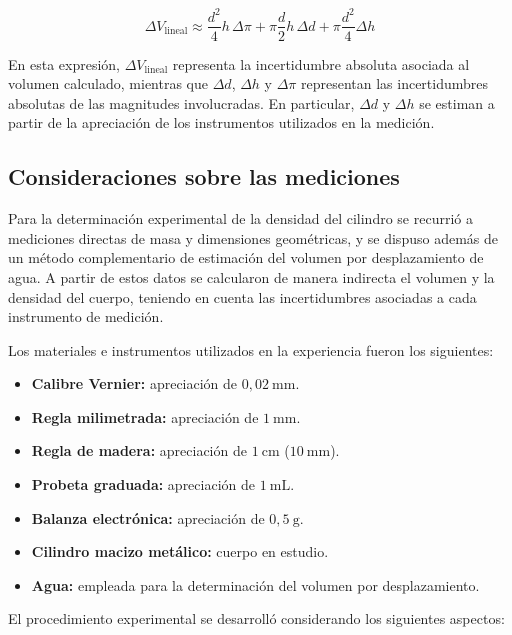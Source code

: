 \begin{equation}
\Delta V_{\text{lineal}} \approx
\frac{d^2}{4} h\, \Delta \pi
+
\pi \frac{d}{2} h\, \Delta d
+
\pi \frac{d^2}{4} \Delta h
\end{equation}

En esta expresión, $\Delta V_{\text{lineal}}$ representa la incertidumbre absoluta asociada al volumen calculado, mientras que $\Delta d$, $\Delta h$ y $\Delta \pi$ representan las incertidumbres absolutas de las magnitudes involucradas. En particular, $\Delta d$ y $\Delta h$ se estiman a partir de la apreciación de los instrumentos utilizados en la medición.


\subsection{Consideraciones sobre las mediciones}

Para la determinación experimental de la densidad del cilindro se recurrió a mediciones directas de masa y dimensiones geométricas, y se dispuso además de un método complementario de estimación del volumen por desplazamiento de agua. A partir de estos datos se calcularon de manera indirecta el volumen y la densidad del cuerpo, teniendo en cuenta las incertidumbres asociadas a cada instrumento de medición.

Los materiales e instrumentos utilizados en la experiencia fueron los siguientes:

\begin{itemize}
    \item \textbf{Calibre Vernier:} apreciación de $0{,}02\ \mathrm{mm}$.
    \item \textbf{Regla milimetrada:} apreciación de $1\ \mathrm{mm}$.
    \item \textbf{Regla de madera:} apreciación de $1\ \mathrm{cm}$ ($10\ \mathrm{mm}$).
    \item \textbf{Probeta graduada:} apreciación de $1\ \mathrm{mL}$.
    \item \textbf{Balanza electrónica:} apreciación de $0{,}5\ \mathrm{g}$.
    \item \textbf{Cilindro macizo metálico:} cuerpo en estudio.
    \item \textbf{Agua:} empleada para la determinación del volumen por desplazamiento.
\end{itemize}

El procedimiento experimental se desarrolló considerando los siguientes aspectos:

